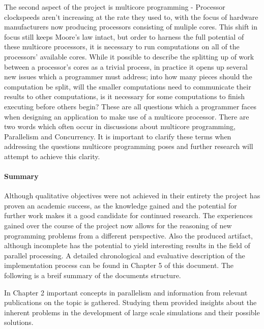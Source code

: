 \documentclass[main.tex]{subfiles}
\begin{document}
The second aspect of the project is multicore programming - Processor clockspeeds aren't increasing at the rate they used to, with the focus of hardware manufacturers now producing processors consisting of muliple cores\cite{Sutter2005}. This shift in focus still keeps Moore's law intact, but order to harness the full potential of these multicore processors, it is necessary to run computations on all of the processors' available cores. While it possible to describe the splitting up of work between a processor's cores as a trivial process, in practice it opens up several new issues which a programmer must address; into how many pieces should the computation be split, will the smaller computations need to communicate their results to other computations, is it necessary for some computations to finish executing before others begin? These are all questions which a programmer faces when designing an application to make use of a multicore processor. There are two words which often occur in discussions about multicore programming, Parallelism and Concurrency. It is important to clarify these terms when addressing the questions multicore programming poses and further research will attempt to achieve this clarity.

\paragraph{Summary}
Although qualitative objectives were not achieved in their entirety the project has proven an academic success, as the knowledge gained and the potential for further work makes it a good candidate for continued research. The experiences gained over the course of the project now allows for the reasoning of new programming problems from a different perspective. Also the produced artifact, although incomplete has the potential to yield interesting results in the field of parallel processing. A detailed chronological and evaluative description of the implementation process can be found in Chapter 5 of this document. The following is a breif summary of the documents structure.

In Chapter 2 important concepts in parallelism  and information from relevant publications on the topic is gathered. Studying them provided insights about the inherent problems in the development of large scale simulations and their possible solutions.
\end{document}
